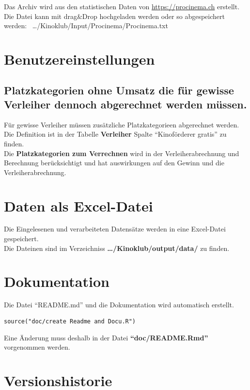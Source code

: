 \documentclass[
]{article}
\begin{document}
Das Archiv wird aus den statistischen Daten von
\url{https://procinema.ch} erstellt.\\
Die Datei kann mit drag\&Drop hochgeladen werden oder so abgespeichert
werden: ~\ldots/Kinoklub/Input/Procinema/Procinema.txt

\section{Benutzereinstellungen}\label{benutzereinstellungen}

\subsection{Platzkategorien ohne Umsatz die für gewisse Verleiher
dennoch abgerechnet werden
müssen.}\label{platzkategorien-ohne-umsatz-die-fuxfcr-gewisse-verleiher-dennoch-abgerechnet-werden-muxfcssen.}

Für gewisse Verleiher müssen zusätzliche Platzkategorieen abgerechnet
werden. Die Definition ist in der Tabelle \textbf{Verleiher} Spalte
``Kinoförderer gratis'' zu finden.\\
Die \textbf{Platzkategorien zum Verrechnen} wird in der
Verleiherabrechnung und Berechnung berücksichtigt und hat auswirkungen
auf den Gewinn und die Verleiherabrechnung.

\section{Daten als Excel-Datei}\label{daten-als-excel-datei}

Die Eingelesenen und verarbeiteten Datensätze werden in eine Excel-Datei
gespeichert.\\
Die Dateinen sind im Verzeichniss \textbf{\ldots/Kinoklub/output/data/}
zu finden.

\section{Dokumentation}\label{dokumentation}

Die Datei ``README.md'' und die Dokumentation wird automatisch erstellt.

\begin{verbatim}
source("doc/create Readme and Docu.R")
\end{verbatim}

Eine Änderung muss deshalb in der Datei \textbf{``doc/README.Rmd''}
vorgenommen werden.

\section{Versionshistorie}\label{versionshistorie}
\end{document}
